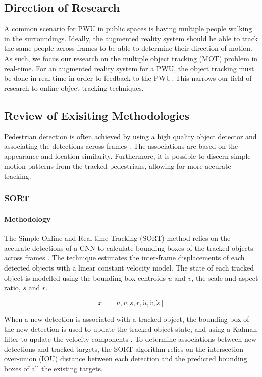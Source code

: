 \subsection{Direction of Research}
 A common scenario for PWU in public spaces is having multiple people walking in the surroundings. Ideally, the augmented reality system should be able to track the same people across frames to be able to determine their direction of motion. As such, we focus our research on the multiple object tracking (MOT) problem in real-time. For an augmented reality system for a PWU, the object tracking must be done in real-time in order to feedback to the PWU. This narrows our field of research to online object tracking techniques.
 
\subsection{Review of Exisiting Methodologies} \label{sec:objectTrack}
 Pedestrian detection is often achieved by using a high quality object detector and associating the detections across frames \cite{Dicle2013}. The associations are based on the appearance and location similarity. Furthermore, it is possible to discern simple motion patterns from the tracked pedestrians, allowing for more accurate tracking.
 
\subsubsection{SORT}
\paragraph{Methodology} The Simple Online and Real-time Tracking (SORT) method relies on the accurate detections of a CNN to calculate bounding boxes of the tracked objects across frames \cite{Bewley2016}. The technique estimates the inter-frame displacements of each detected objects with a linear constant velocity model. The state of each tracked object is modelled using the bounding box centroids $u$ and $v$, the scale and aspect ratio, $s$ and $r$.

\[x = [u, v, s, r, \dot{u}, \dot{v}, \dot{s}] \]

When a new detection is associated with a tracked object, the bounding box of the new detection is used to update the tracked object state, and using a Kalman filter to update the velocity components \cite{Kalman1961}. To determine associations between new detections and tracked targets, the SORT algorithm relies on the intersection-over-union (IOU) distance between each detection and the predicted bounding boxes of all the existing targets.

